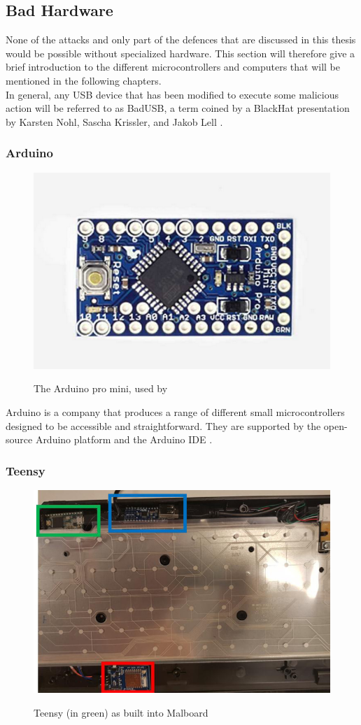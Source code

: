 \subsection{Bad Hardware}

None of the attacks and only part of the defences that are discussed in this thesis would be possible without specialized hardware. This section will therefore give a brief introduction to the different microcontrollers and computers that will be mentioned in the following chapters.\\
In general, any USB device that has been modified to execute some malicious action will be referred to as BadUSB, a term coined by a BlackHat presentation by Karsten Nohl, Sascha Krissler, and Jakob Lell \cite{Srlabsbadusbblackhatv1Pdf2014}. 


\subsubsection{Arduino}

\begin{figure}[H]
    \centering
    \includegraphics[width=0.25\linewidth]{visuals/arduinomini.png}
    \caption{The Arduino pro mini, used by \cite{bojovicRisingThreatHardware2019}}
    \label{fig:ArduinoProMini}
    \cite{ArduinoProMini}
\end{figure}
Arduino \cite{ArduinoHardware} is a company that produces a range of different small microcontrollers designed to be accessible and straightforward. They are supported by the open-source Arduino platform and the Arduino IDE \cite{ArduinoArduino2024}.


\subsubsection{Teensy}

\begin{figure}[H]
    \centering
    \includegraphics[width=0.5\linewidth]{visuals/teensy.png}
    \caption{Teensy (in green) as built into Malboard}
    \label{fig:builtInTeensy}
    \cite{farhiMalboardNovelUser2019}
\end{figure}

